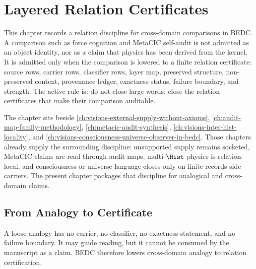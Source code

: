 \chapter{Layered Relation Certificates}
\label{ch:visions-layered-relation-certificate}

This chapter records a relation discipline for cross-domain comparisons in BEDC. A comparison such as force cognition and MetaCIC self-audit is not admitted as an object identity, nor as a claim that physics has been derived from the kernel. It is admitted only when the comparison is lowered to a finite relation certificate: source rows, carrier rows, classifier rows, layer map, preserved structure, non-preserved content, provenance ledger, exactness status, failure boundary, and strength. The active rule is: do not close large words; close the relation certificates that make their comparison auditable.

The chapter sits beside \autoref{ch:visions-external-supply-without-axioms}, \autoref{ch:audit-map-family-methodology}, \autoref{ch:metacic-audit-synthesis}, \autoref{ch:visions-inter-hist-locality}, and \autoref{ch:visions-consciousness-universe-observer-in-bedc}. Those chapters already supply the surrounding discipline: unsupported supply remains socketed, MetaCIC claims are read through audit maps, multi-$\Hist$ physics is relation-local, and consciousness or universe language closes only on finite records-side carriers. The present chapter packages that discipline for analogical and cross-domain claims.

\section{From Analogy to Certificate}
\label{sec:layered-relation-from-analogy-to-certificate}

A loose analogy has no carrier, no classifier, no exactness statement, and no failure boundary. It may guide reading, but it cannot be consumed by the manuscript as a claim. BEDC therefore lowers cross-domain analogy to relation certification.

